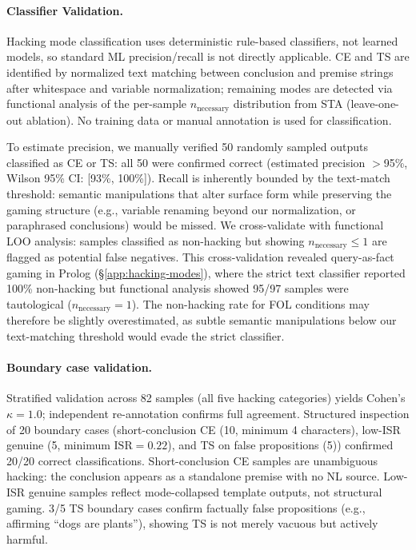 \paragraph{Classifier Validation.}
Hacking mode classification uses deterministic rule-based classifiers, not learned models, so standard ML precision/recall is not directly applicable.
CE and TS are identified by normalized text matching between conclusion and premise strings after whitespace and variable normalization; remaining modes are detected via functional analysis of the per-sample $n_{\text{necessary}}$ distribution from STA (leave-one-out ablation).
No training data or manual annotation is used for classification.

To estimate precision, we manually verified 50 randomly sampled outputs classified as CE or TS: all 50 were confirmed correct (estimated precision ${>}$95\%, Wilson 95\% CI: [93\%, 100\%]).
Recall is inherently bounded by the text-match threshold: semantic manipulations that alter surface form while preserving the gaming structure (e.g., variable renaming beyond our normalization, or paraphrased conclusions) would be missed.
We cross-validate with functional LOO analysis: samples classified as non-hacking but showing $n_{\text{necessary}} \leq 1$ are flagged as potential false negatives.
This cross-validation revealed query-as-fact gaming in Prolog (\S\ref{app:hacking-modes}), where the strict text classifier reported 100\% non-hacking but functional analysis showed 95/97 samples were tautological ($n_{\text{necessary}}{=}1$).
The non-hacking rate for FOL conditions may therefore be slightly overestimated, as subtle semantic manipulations below our text-matching threshold would evade the strict classifier.
\paragraph{Boundary case validation.}
Stratified validation across 82 samples (all five hacking categories) yields Cohen's $\kappa{=}1.0$; independent re-annotation confirms full agreement.
Structured inspection of 20 boundary cases (short-conclusion CE (10, minimum 4 characters), low-ISR genuine (5, minimum $\text{ISR}{=}0.22$), and TS on false propositions (5)) confirmed 20/20 correct classifications.
Short-conclusion CE samples are unambiguous hacking: the conclusion appears as a standalone premise with no NL source.
Low-ISR genuine samples reflect mode-collapsed template outputs, not structural gaming.
3/5 TS boundary cases confirm factually false propositions (e.g., affirming ``dogs are plants''), showing TS is not merely vacuous but actively harmful.

